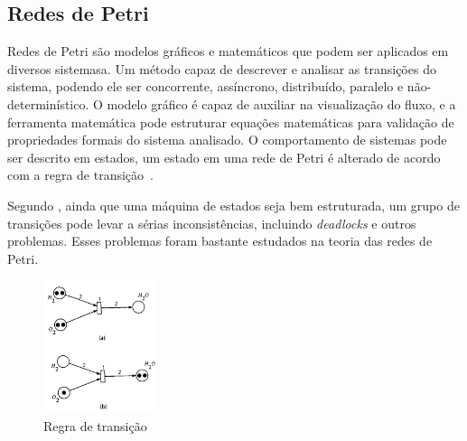 

\subsection{Redes de Petri}

Redes de Petri são modelos gráficos e matemáticos que podem ser aplicados em diversos sistemasa. Um método capaz de descrever e analisar as transições do sistema, podendo ele ser concorrente, assíncrono, distribuído, paralelo e não-determinístico. O modelo gráfico é capaz de auxiliar na visualização do fluxo, e a ferramenta matemática pode estruturar equações matemáticas para validação de propriedades formais do sistema analisado. O comportamento de sistemas pode ser descrito em estados, um estado em uma rede de Petri é alterado de acordo com a regra de transição~\cite{murata:1989}.


Segundo , ainda que uma máquina de estados seja bem estruturada, um grupo de transições pode levar a sérias inconsistências, incluindo \textit{deadlocks} e outros problemas. Esses problemas foram bastante estudados na teoria das redes de Petri. 

 \begin{figure}[H]
	\centering
    	\caption{\label{fig:petri}Regra de transição}
		\includegraphics[width = 0.3\textwidth]	{resources/petri}
\end{figure}

